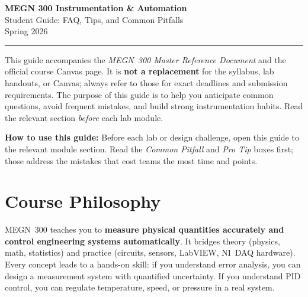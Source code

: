 \documentclass[11pt,letterpaper]{article}
\begin{document}
\begin{center}
    {\LARGE\bfseries\textcolor{minesblue}{MEGN 300 Instrumentation \& Automation}}\\[6pt]
    {\Large\textcolor{minesblue!70}{Student Guide: FAQ, Tips, and Common Pitfalls}}\\[8pt]
    {\large Spring 2026}\\[4pt]
    \textcolor{minesgold}{\rule{0.6\textwidth}{2pt}}
\end{center}

\vspace{0.5cm}

\noindent This guide accompanies the \textit{MEGN~300 Master Reference Document} and the official course Canvas page. It is \textbf{not a replacement} for the syllabus, lab handouts, or Canvas; always refer to those for exact deadlines and submission requirements. The purpose of this guide is to help you anticipate common questions, avoid frequent mistakes, and build strong instrumentation habits. Read the relevant section \textit{before} each lab module.

\begin{tcolorbox}[colback=minesgold!10, colframe=minesgold!70!black, boxrule=0.6pt, arc=2pt, left=6pt, right=6pt, top=4pt, bottom=4pt]
\textbf{How to use this guide:} Before each lab or design challenge, open this guide to the relevant module section. Read the \textit{Common Pitfall} and \textit{Pro Tip} boxes first; those address the mistakes that cost teams the most time and points.
\end{tcolorbox}

\tableofcontents
\newpage

\section{Course Philosophy}

\begin{faqbox}
MEGN~300 teaches you to \textbf{measure physical quantities accurately and control engineering systems automatically}. It bridges theory (physics, math, statistics) and practice (circuits, sensors, LabVIEW, NI~DAQ hardware). Every concept leads to a hands-on skill: if you understand error analysis, you can design a measurement system with quantified uncertainty. If you understand PID control, you can regulate temperature, speed, or pressure in a real system.
\end{faqbox}
\end{document}

